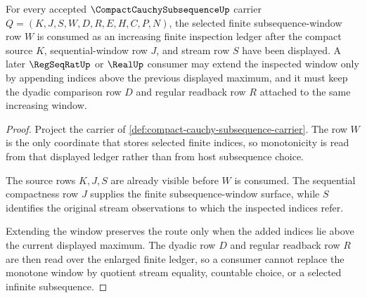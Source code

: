 \begin{theorem}
\label{thm:compact-cauchy-subsequence-finite-window-monotonicity}
For every accepted $\CompactCauchySubsequenceUp$ carrier $Q=(K,J,S,W,D,R,E,H,C,P,N)$, the selected finite subsequence-window row $W$ is consumed as an increasing finite inspection ledger after the compact source $K$, sequential-window row $J$, and stream row $S$ have been displayed. A later $\RegSeqRatUp$ or $\RealUp$ consumer may extend the inspected window only by appending indices above the previous displayed maximum, and it must keep the dyadic comparison row $D$ and regular readback row $R$ attached to the same increasing window.
\end{theorem}
\begin{proof}
Project the carrier of \autoref{def:compact-cauchy-subsequence-carrier}. The row $W$ is the only coordinate that stores selected finite indices, so monotonicity is read from that displayed ledger rather than from host subsequence choice.

The source rows $K,J,S$ are already visible before $W$ is consumed. The sequential compactness row $J$ supplies the finite subsequence-window surface, while $S$ identifies the original stream observations to which the inspected indices refer.

Extending the window preserves the route only when the added indices lie above the current displayed maximum. The dyadic row $D$ and regular readback row $R$ are then read over the enlarged finite ledger, so a consumer cannot replace the monotone window by quotient stream equality, countable choice, or a selected infinite subsequence.
\end{proof}

